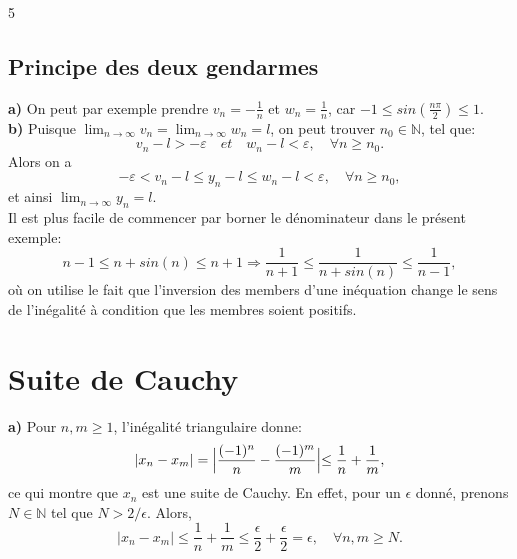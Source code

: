 5\documentclass[a4paper, 12pt, french, twoside]{article}
\newcommand{\Nn}{{\mathbb{N}}}
\begin{document}
\subsection{Principe des deux gendarmes}

\textbf{a)} On peut par exemple prendre $v_n = -\frac{1}{n}$ et $w_n = \frac{1}{n}$, car $-1 \leq sin(\frac{n \pi}{2}) \leq 1$. \\

\textbf{b)} Puisque $\lim_{n\rightarrow\infty}v_n=\lim_{n\rightarrow\infty}w_n=l$, on peut trouver $n_0\in\Nn$, tel que:
\begin{equation*}
    v_n-l>-\varepsilon \quad et \quad w_n-l<\varepsilon, \quad \forall n \geq n_0.
\end{equation*}
Alors on a 
\begin{equation*}
    -\varepsilon<v_n-l\leq y_n-l \leq w_n-l < \varepsilon, \quad \forall n \geq n_0,
\end{equation*}
et ainsi $\lim_{n\rightarrow\infty}y_n=l.  $ \\

\faLightbulbO \quad {} Il est plus facile de commencer par borner le dénominateur dans le présent exemple:
\begin{equation}
    n-1 \leq n + sin(n) \leq n+1 \Rightarrow \frac{1}{n+1} \leq \frac{1}{n + sin(n)} \leq \frac{1}{n-1},
\end{equation}
où on utilise le fait que l'inversion des members d'une inéquation change le sens de l'inégalité à condition que les membres soient positifs.

\section{Suite de Cauchy}

\textbf{a)} Pour $n,m \geq 1$, l'inégalité triangulaire donne:
\begin{equation}
    |x_n - x_m| = \Bigl\lvert\frac{(-1)^n}{n} - \frac{(-1)^m}{m}\Bigl\rvert \leq \frac{1}{n} + \frac{1}{m},
\end{equation}
ce qui montre que $x_n$ est une suite de Cauchy. En effet, pour un $\epsilon$ donné, prenons $N \in \Nn$ tel que $N > 2/\epsilon$. Alors,
\begin{equation}
    |x_n - x_m| \leq \frac{1}{n} + \frac{1}{m} \leq \frac{\epsilon}{2} + \frac{\epsilon}{2} = \epsilon, \quad \forall n,m \geq N.
\end{equation}
\\
\end{document}
